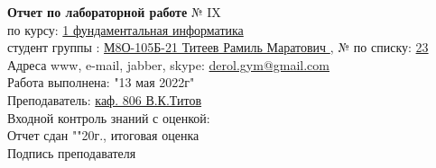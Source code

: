 \documentclass[10pt]{report}
\begin{document}
    \begin{spacing}{1.7}
        \hspace{1.2in}
        \textbf {Отчет по лабораторной работе} № IX\\     %
        \indent \hspace{1.2in} по курсу: \underline{1 фундаментальная информатика } \\
        \indent \hspace{1.2in} студент группы : \underline{М8О-105Б-21 Титеев Рамиль Маратович }, № по списку: \underline{ 23 } \\
        \indent \hspace{1.2in} Адреса www, e-mail, jabber, skype: \underline{ derol.gym@gmail.com } \\
        \indent \hspace{1.2in} Работа выполнена: "13 мая 2022г" \\   %
        \indent \hspace{1.2in} Преподаватель: \underline{ каф. 806 В.К.Титов} \\
        \indent \hspace{1.2in} Входной контроль знаний с оценкой: \tlinee{2in} \\
        \indent \hspace{1.2in} Отчет сдан "\tlinee{0.2in}"\tlinee{1in}20\tlinee{0.2in}г., итоговая оценка \tlinee{1in}\\
        \indent \hspace{1.2in} Подпись преподавателя \tlinee{1.2in}\\
    \end{spacing}
    
\end{document}
